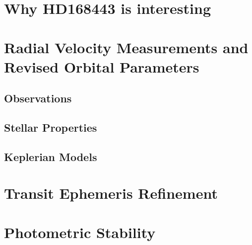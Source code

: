 \documentclass[12pt,preprint]{emulateapj}
\begin{document}

\section{Why HD168443 is interesting}
\label{motivation}


\section{Radial Velocity Measurements and Revised Orbital Parameters}
\label{revisedop}


\subsection{Observations}


\subsection{Stellar Properties}
\label{steprop}




\subsection{Keplerian Models}






\section{Transit Ephemeris Refinement}
\label{ephemeris}



\section{Photometric Stability}
\label{sec:photo}


\end{document}
